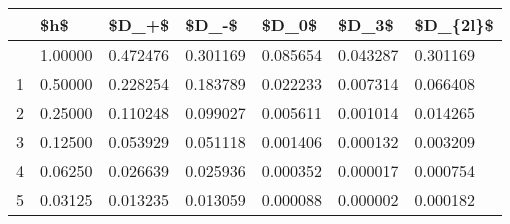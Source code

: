 \documentclass[
  letterpaper,
  DIV=11,
  numbers=noendperiod]{scrreprt}
\newenvironment{Shaded}{\begin{snugshade}}{\end{snugshade}}
\newcommand{\CommentTok}[1]{\textcolor[rgb]{0.37,0.37,0.37}{#1}}
\newcommand{\NormalTok}[1]{\textcolor[rgb]{0.00,0.23,0.31}{#1}}
\newcommand{\OperatorTok}[1]{\textcolor[rgb]{0.37,0.37,0.37}{#1}}
\newcommand{\SpecialCharTok}[1]{\textcolor[rgb]{0.37,0.37,0.37}{#1}}
\newcommand{\StringTok}[1]{\textcolor[rgb]{0.13,0.47,0.30}{#1}}
\begin{document}
\begin{longtable}[]{@{}lllllll@{}}
\toprule\noalign{}
& \$h\$ & \$D\_+\$ & \$D\_-\$ & \$D\_0\$ & \$D\_3\$ & \$D\_\{2l\}\$ \\
\midrule\noalign{}
\endhead
\bottomrule\noalign{}
\endlastfoot
0 & 1.00000 & 0.472476 & 0.301169 & 0.085654 & 0.043287 & 0.301169 \\
1 & 0.50000 & 0.228254 & 0.183789 & 0.022233 & 0.007314 & 0.066408 \\
2 & 0.25000 & 0.110248 & 0.099027 & 0.005611 & 0.001014 & 0.014265 \\
3 & 0.12500 & 0.053929 & 0.051118 & 0.001406 & 0.000132 & 0.003209 \\
4 & 0.06250 & 0.026639 & 0.025936 & 0.000352 & 0.000017 & 0.000754 \\
5 & 0.03125 & 0.013235 & 0.013059 & 0.000088 & 0.000002 & 0.000182 \\
\end{longtable}

\begin{Shaded}
\end{Shaded}
\end{document}
